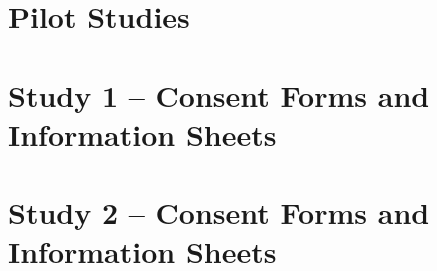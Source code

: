 \documentclass[11pt, oneside, a4paper]{book}
\begin{document}
\chapter{Pilot Studies} \label{apx:PilotStudies}
\graphicspath{{../pilot_studies/}}



\chapter{Study 1 -- Consent Forms and Information Sheets} \label{apx:Exp1:InformedConsentForms}



\chapter{Study 2 -- Consent Forms and Information Sheets} \label{apx:Exp2:InformedConsentForms}


%

%
\end{document}
